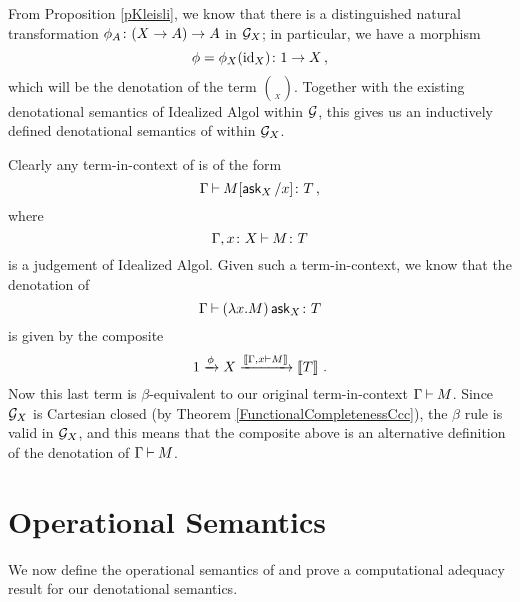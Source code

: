 \documentclass[11pt]{report}
\begin{document}
From Proposition \ref{pKleisli}, we know that there is a distinguished natural transformation $\phi_A \colon (X \to A) \to A$ in $\mathcal G_X$; in particular, we have a morphism
\[
  \phi = \phi_X(\operatorname{id}_X) \colon 1 \to X\,,
  \]
which will be the denotation of the term $\choose_X$.
Together with the existing denotational semantics of Idealized Algol within $\mathcal G$, this gives us an inductively defined denotational semantics of \IAX within $\mathcal G_X$.

Clearly any term-in-context of \IAX is of the form
\[
  \Gamma \mathbin{\vdash} M[\operatorname{{\mathsf{ask}}}_X/x]\colon T\,,
  \]
where
\[
  \Gamma,x\colon X \mathbin{\vdash} M \colon T
  \]
is a judgement of Idealized Algol.
Given such a term-in-context, we know that the denotation of
\[
  \Gamma\mathbin{\vdash} (\lambda x.M) \operatorname{{\mathsf{ask}}}_X \colon T
  \]
is given by the composite
\[
  1 \xrightarrow{\phi}
  X \xrightarrow{\left\llbracket\Gamma,x \mathbin{\vdash} M\right\rrbracket}
  \left\llbracket T\right\rrbracket\,.
  \]
Now this last term is $\beta$-equivalent to our original term-in-context $\Gamma\mathbin{\vdash} M$.  
Since $\mathcal G_X$ is Cartesian closed (by Theorem \ref{FunctionalCompletenessCcc}), the $\beta$ rule is valid in $\mathcal G_X$, and this means that the composite above is an alternative definition of the denotation of $\Gamma\mathbin{\vdash} M$.

\section{Operational Semantics}

We now define the operational semantics of \IAX and prove a computational adequacy result for our denotational semantics.
\end{document}
